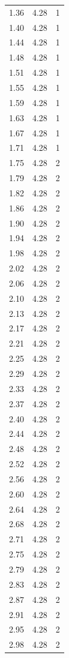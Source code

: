 \begin{longtable}{lrr}
  1.36 & 4.28 & 1 \\
  1.40 & 4.28 & 1 \\
  1.44 & 4.28 & 1 \\
  1.48 & 4.28 & 1 \\
  1.51 & 4.28 & 1 \\
  1.55 & 4.28 & 1 \\
  1.59 & 4.28 & 1 \\
  1.63 & 4.28 & 1 \\
  1.67 & 4.28 & 1 \\
  1.71 & 4.28 & 1 \\
  1.75 & 4.28 & 2 \\
  1.79 & 4.28 & 2 \\
  1.82 & 4.28 & 2 \\
  1.86 & 4.28 & 2 \\
  1.90 & 4.28 & 2 \\
  1.94 & 4.28 & 2 \\
  1.98 & 4.28 & 2 \\
  2.02 & 4.28 & 2 \\
  2.06 & 4.28 & 2 \\
  2.10 & 4.28 & 2 \\
  2.13 & 4.28 & 2 \\
  2.17 & 4.28 & 2 \\
  2.21 & 4.28 & 2 \\
  2.25 & 4.28 & 2 \\
  2.29 & 4.28 & 2 \\
  2.33 & 4.28 & 2 \\
  2.37 & 4.28 & 2 \\
  2.40 & 4.28 & 2 \\
  2.44 & 4.28 & 2 \\
  2.48 & 4.28 & 2 \\
  2.52 & 4.28 & 2 \\
  2.56 & 4.28 & 2 \\
  2.60 & 4.28 & 2 \\
  2.64 & 4.28 & 2 \\
  2.68 & 4.28 & 2 \\
  2.71 & 4.28 & 2 \\
  2.75 & 4.28 & 2 \\
  2.79 & 4.28 & 2 \\
  2.83 & 4.28 & 2 \\
  2.87 & 4.28 & 2 \\
  2.91 & 4.28 & 2 \\
  2.95 & 4.28 & 2 \\
  2.98 & 4.28 & 2 \\

\end{longtable}
